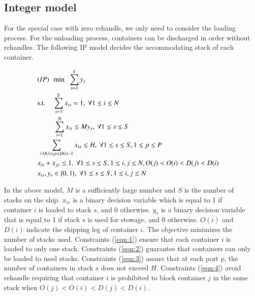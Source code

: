 \documentclass[review,3p,times,authoryear,12pt]{elsarticle}
\newtheorem{proposition}{Proposition}
\begin{document}
%
%


\subsection{Integer model}
For the special case with zero rehandle, we only need to consider the loading process. For the unloading process, containers can be discharged in order without rehandles. The following IP model decides the accommodating stack of each container.
\begin{small}
\begin{align}
& (IP)~~\min\hspace{6pt}\sum_{s=1}^{S} y_s\notag\\
& \mathrm{s.t.}\hspace{11pt}\sum_{s=1}^{S} x_{is}=1, ~\forall 1\le i \le N \label{eqn:1}\\
& \hspace{24pt}\sum_{i=1}^{N} x_{is}\le M y_s, ~\forall 1\le s \le S	\label{eqn:2}\\
& \hspace{2pt}\sum_{i:O(i)\le p\le D(i)-1} x_{is}\le H, ~\forall 1\le s\le S, 1\le p\le P		\label{eqn:3}\\
& x_{is}+x_{js}\le 1, ~\forall 1\le s\le S, 1\le i,j\le N, O(j)<O(i)<D(j)<D(i)	\label{eqn:4}\\
& x_{is}, y_s \in \{0,1\}, ~\forall 1\le s\le S,1\le i,j\le N
\end{align}
\end{small}

In the above model, $M$ is a sufficiently large number and $S$ is the number of stacks on the ship.
$x_{is}$ is a binary decision variable which is equal to 1 if container $i$ is loaded to stack $s$, and 0 otherwise.
$y_s$ is a binary decision variable that is equal to 1 if stack $s$ is used for stowage, and 0 otherwise.
$O(i)$ and $D(i)$ indicate the shipping leg of container $i$.
The objective minimizes the number of stacks used.
Constraints (\ref{eqn:1}) ensure that each container $i$ is loaded to only one stack.
Constraints (\ref{eqn:2}) guarantee that containers can only be loaded to used stacks.
Constraints (\ref{eqn:3}) assure that at each port $p$, the number of containers in stack $s$ does not exceed $H$.
Constraints (\ref{eqn:4}) avoid rehandle requiring that container $i$ is prohibited to block container $j$ in the same stack when $O(j)<O(i)<D(j)<D(i)$.
\end{document}
